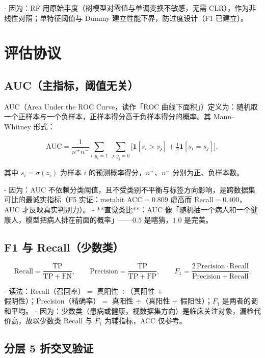 \documentclass{internal-report}
\begin{document}
- 因为：RF 用原始丰度（树模型对零值与单调变换不敏感，无需 CLR），作为非线性对照；单特征阈值与 Dummy 建立性能下界，防过度设计（F1 已建立）。

\section{评估协议}
\label{sec:eval}

\subsection{AUC（主指标，阈值无关）}

AUC（Area Under the ROC Curve，读作「ROC 曲线下面积」）定义为：随机取一个正样本与一个负样本，正样本得分高于负样本得分的概率。其 Mann--Whitney 形式：

\begin{equation}
  \mathrm{AUC} = \frac{1}{n^{+}n^{-}}
  \sum_{i:y_i=1}\ \sum_{j:y_j=0}
  \Big[ \mathbf{1}[s_i > s_j] + \tfrac{1}{2}\mathbf{1}[s_i = s_j] \Big],
  \label{eq:auc}
\end{equation}

其中 $s_i=\sigma(z_i)$ 为样本 $i$ 的预测概率得分，$n^{+}$、$n^{-}$ 分别为正、负样本数。

- 因为：AUC 不依赖分类阈值，且不受类别不平衡与标签方向影响，是跨数据集可比的最诚实指标（F5 实证：metahit ACC$=0.809$ 虚高而 Recall$=0.400$，AUC 才反映真实判别力）。
- **直觉类比**：AUC 像「随机抽一个病人和一个健康人，模型把病人排在前面的概率」——$0.5$ 是瞎猜，$1.0$ 是完美。

\subsection{F1 与 Recall（少数类）}

\begin{equation}
  \mathrm{Recall} = \frac{\mathrm{TP}}{\mathrm{TP}+\mathrm{FN}},
  \qquad
  \mathrm{Precision} = \frac{\mathrm{TP}}{\mathrm{TP}+\mathrm{FP}},
  \qquad
  F_1 = \frac{2\,\mathrm{Precision}\cdot\mathrm{Recall}}{\mathrm{Precision}+\mathrm{Recall}}.
  \label{eq:f1}
\end{equation}

- 读法：Recall（召回率）$=$ 真阳性 $\div$（真阳性 $+$ 假阴性）；Precision（精确率）$=$ 真阳性 $\div$（真阳性 $+$ 假阳性）；$F_1$ 是两者的调和平均。
- 因为：少数类（患病或健康，视数据集方向）是临床关注对象，漏检代价高，故以少数类 Recall 与 $F_1$ 为辅指标，ACC 仅参考。

\subsection{分层 5 折交叉验证}
\end{document}
